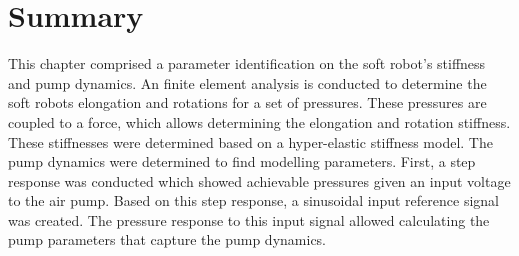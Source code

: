 \section*{Summary} 

This chapter comprised a parameter identification on the soft robot's stiffness and pump dynamics. An finite element analysis is conducted to determine the soft robots elongation and rotations for a set of pressures. These pressures are coupled to a force, which allows determining the elongation and rotation stiffness. These stiffnesses were determined based on a hyper-elastic stiffness model. The pump dynamics were determined to find modelling parameters. First, a step response was conducted which showed achievable pressures given an input voltage to the air pump. Based on this step response, a sinusoidal input reference signal was created. The pressure response to this input signal allowed calculating the pump parameters that capture the pump dynamics.  

